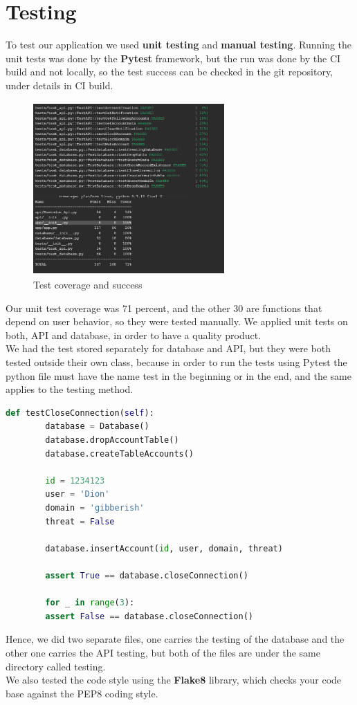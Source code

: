\section{Testing}
To test our application we used \textbf{unit testing} and \textbf{manual testing}.
Running the unit tests was done by the \textbf{Pytest} \cite{pytest} framework, but the run was done by
the CI build and not locally, so the test success can be checked in the git repository, under
details in CI build.
\\[5pt]
\begin{figure}[H]
	\centering
	\includegraphics[width=0.65\textwidth,height=250px]{images/test_score.png}
	\caption{Test coverage and success}
	\label{fig:test_data}
\end{figure}
Our unit test coverage was 71 percent, and the other 30 are functions that depend on user behavior, so they were tested manually.
We applied unit tests on both, API and database, in order to have a quality product.
\\[5pt]
We had the test stored separately for database and API, but they were both tested outside their own class, because
in order to run the tests using Pytest the python file must have the name test in the beginning or in the end, and the
same applies to the testing method.
\begin{lstlisting}[language=python, caption={Testing a unit example}, captionpos=b]
 	def testCloseConnection(self):
		database = Database()
		database.dropAccountTable()
		database.createTableAccounts()

		id = 1234123
		user = 'Dion'
		domain = 'gibberish'
		threat = False

		database.insertAccount(id, user, domain, threat)

		assert True == database.closeConnection()

		for _ in range(3):
		assert False == database.closeConnection()
\end{lstlisting}
Hence, we did two separate files, one carries the testing of the database and the other one carries the API testing, but
both of the files are under the same directory called testing.
\\[5pt]
We also tested the code style using the \textbf{Flake8} \cite{flake} library, which checks your code base against the PEP8 coding
style.
